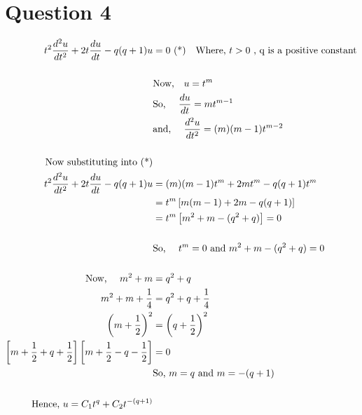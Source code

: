 \documentclass[letterpaper,12pt,titlepage,oneside,final]{book}
\begin{document}
\clearpage


\section*{Question 4}
\begin{align*}
t^2 \frac{d^2u}{dt^2} + 2t \frac{du}{dt} -q(q+1)u &= 0\text{ (*)} \quad \text{Where, $t>0$ , q is a positive constant}\\
\\
&\text{Now,}\quad u = t^m\\
&\text{So, }\quad \frac{du}{dt} = mt^{m-1}\\
&\text{and, }\quad \frac{d^2u}{dt^2} = (m)(m-1)t^{m-2}\\
\\
\text{Now substituting into (*)}\\
t^2 \frac{d^2u}{dt^2} + 2t \frac{du}{dt} -q(q+1)u &= (m)(m-1)t^{m} + 2 mt^{m} -q(q+1)t^m \\
&= t^m \left[ m(m-1) + 2m -q(q+1)\right]\\
&= t^m \left[ m^2 + m - (q^2 +q)\right] = 0 \\
\\
&\text{So, $\quad t^m = 0$ and $ m^2 + m - (q^2 +q) = 0$}\\
\\
\text{Now, }\quad m^2 + m &= q^2 +q\\ 
m^2 + m + \frac{1}{4} & = q^2 +q + \frac{1}{4}\\  
\left(m+\frac{1}{2}\right)^2 &= \left( q + \frac{1}{2} \right)^2 \\
\left[m+\frac{1}{2} +  q + \frac{1}{2} \right]\left[m+\frac{1}{2} - q - \frac{1}{2} \right]& = 0\\
&\text{So, $ m = q$ and $m = -(q+1)$}\\
\\
\text{Hence, } u =  C_1 t^q + C_2 t^{-(q+1)}
\end{align*}
\clearpage
\end{document}
